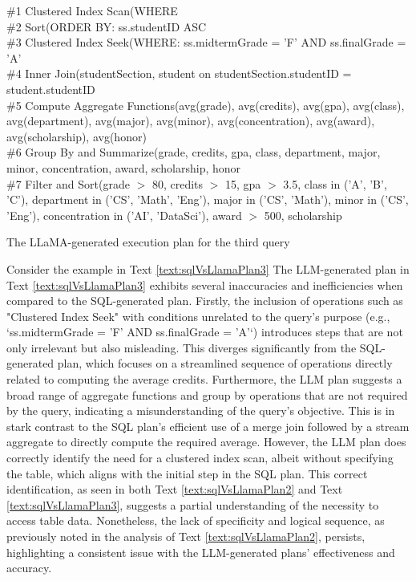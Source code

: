 \begin{text}
  \ContinuedFloat
  \#1 Clustered Index Scan(WHERE\\
  \#2 Sort(ORDER BY: ss.studentID ASC\\
  \#3 Clustered Index Seek(WHERE: ss.midtermGrade = 'F' AND ss.finalGrade = 'A'\\
  \#4 Inner Join(studentSection, student on studentSection.studentID = student.studentID\\
  \#5 Compute Aggregate Functions(avg(grade), avg(credits), avg(gpa), avg(class), avg(department), avg(major), avg(minor), avg(concentration), avg(award), avg(scholarship), avg(honor)\\
  \#6 Group By and Summarize(grade, credits, gpa, class, department, major, minor, concentration, award, scholarship, honor\\
  \#7 Filter and Sort(grade $>$ 80, credits $>$ 15, gpa $>$ 3.5, class in ('A', 'B', 'C'), department in ('CS', 'Math', 'Eng'), major in ('CS', 'Math'), minor in ('CS', 'Eng'), concentration in ('AI', 'DataSci'), award $>$ 500, scholarship
  \caption{The LLaMA-generated execution plan for the third query}
\end{text}

Consider the example in Text \ref{text:sqlVsLlamaPlan3} The LLM-generated plan in Text \ref{text:sqlVsLlamaPlan3} exhibits several inaccuracies and inefficiencies when compared to the SQL-generated plan. Firstly, the inclusion of operations such as "Clustered Index Seek" with conditions unrelated to the query's purpose (e.g., `ss.midtermGrade = 'F' AND ss.finalGrade = 'A'`) introduces steps that are not only irrelevant but also misleading. This diverges significantly from the SQL-generated plan, which focuses on a streamlined sequence of operations directly related to computing the average credits. Furthermore, the LLM plan suggests a broad range of aggregate functions and group by operations that are not required by the query, indicating a misunderstanding of the query's objective. This is in stark contrast to the SQL plan's efficient use of a merge join followed by a stream aggregate to directly compute the required average. However, the LLM plan does correctly identify the need for a clustered index scan, albeit without specifying the table, which aligns with the initial step in the SQL plan. This correct identification, as seen in both Text \ref{text:sqlVsLlamaPlan2} and Text \ref{text:sqlVsLlamaPlan3}, suggests a partial understanding of the necessity to access table data. Nonetheless, the lack of specificity and logical sequence, as previously noted in the analysis of Text \ref{text:sqlVsLlamaPlan2}, persists, highlighting a consistent issue with the LLM-generated plans' effectiveness and accuracy.

